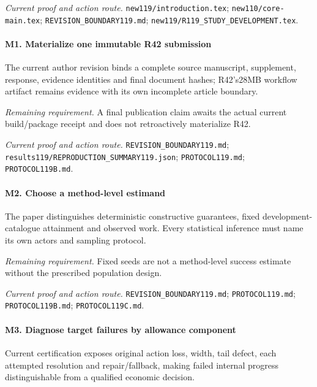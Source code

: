 \par\emph{Current proof and action route.} \nolinkurl{new119/introduction.tex}; \nolinkurl{new110/core-main.tex}; \nolinkurl{REVISION_BOUNDARY119.md}; \nolinkurl{new119/R119_STUDY_DEVELOPMENT.tex}.

\paragraph{M1. Materialize one immutable R42 submission}

The current author revision binds a complete source manuscript, supplement, response, evidence identities and final document hashes; R42's28MB workflow artifact remains evidence with its own incomplete article boundary.

\par\emph{Remaining requirement.} A final publication claim awaits the actual current build/\allowbreak{}package receipt and does not retroactively materialize R42.

\par\emph{Current proof and action route.} \nolinkurl{REVISION_BOUNDARY119.md}; \nolinkurl{results119/REPRODUCTION_SUMMARY119.json}; \nolinkurl{PROTOCOL119.md}; \nolinkurl{PROTOCOL119B.md}.

\paragraph{M2. Choose a method-level estimand}

The paper distinguishes deterministic constructive guarantees, fixed development-catalogue attainment and observed work. Every statistical inference must name its own actors and sampling protocol.

\par\emph{Remaining requirement.} Fixed seeds are not a method-level success estimate without the prescribed population design.

\par\emph{Current proof and action route.} \nolinkurl{REVISION_BOUNDARY119.md}; \nolinkurl{PROTOCOL119.md}; \nolinkurl{PROTOCOL119B.md}; \nolinkurl{PROTOCOL119C.md}.

\paragraph{M3. Diagnose target failures by allowance component}

Current certification exposes original action loss, width, tail defect, each attempted resolution and repair/\allowbreak{}fallback, making failed internal progress distinguishable from a qualified economic decision.

